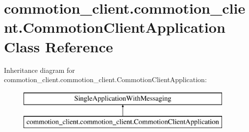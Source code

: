 \hypertarget{classcommotion__client_1_1commotion__client_1_1CommotionClientApplication}{\section{commotion\+\_\+client.\+commotion\+\_\+client.\+Commotion\+Client\+Application Class Reference}
\label{classcommotion__client_1_1commotion__client_1_1CommotionClientApplication}
}
Inheritance diagram for commotion\+\_\+client.\+commotion\+\_\+client.\+Commotion\+Client\+Application\+:\begin{figure}[H]
\begin{center}
\leavevmode
\includegraphics[height=2.000000cm]{classcommotion__client_1_1commotion__client_1_1CommotionClientApplication}
\end{center}
\end{figure}
